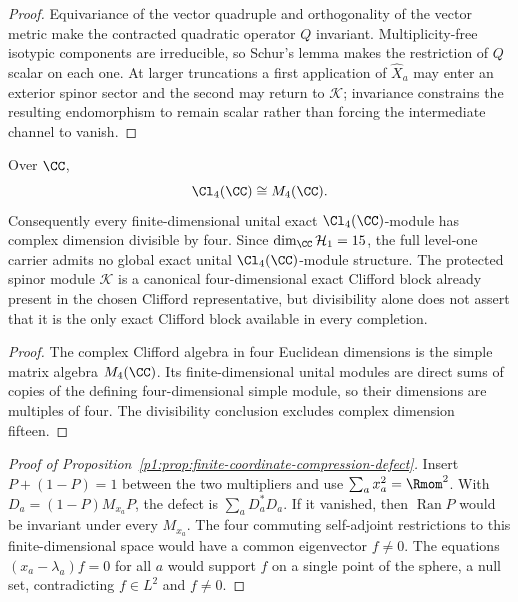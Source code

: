 \documentclass[11pt]{article}
\begin{document}
\begin{proof}
Equivariance of the vector quadruple and orthogonality of the vector metric
make the contracted quadratic operator \(Q\) invariant.  Multiplicity-free
isotypic components are irreducible, so Schur's lemma makes the restriction of
\(Q\) scalar on each one.  At larger truncations a first application of
\(\widehat X_a\) may enter an exterior spinor sector and the second may return
to \(\mathcal K\); invariance constrains the resulting endomorphism to remain
scalar rather than forcing the intermediate channel to vanish.
\end{proof}

\begin{proposition}
\label{p1:prop:global-clifford-divisibility-obstruction}
Over \(\CC\),
\[
 \Cl_4(\CC)\cong M_4(\CC).
\]
Consequently every finite-dimensional unital exact
\(\Cl_4(\CC)\)-module has complex dimension divisible by four.  Since
\(\dim_{\CC}\mathcal H_1=15\), the full level-one carrier admits no global
exact unital \(\Cl_4(\CC)\)-module structure.  The protected spinor module
\(\mathcal K\) is a canonical four-dimensional exact Clifford block already
present in the chosen Clifford representative, but divisibility alone does
not assert that it is the only exact Clifford block available in every
completion.
\end{proposition}

\begin{proof}
The complex Clifford algebra in four Euclidean dimensions is the simple
matrix algebra \(M_4(\CC)\).  Its finite-dimensional unital modules are direct
sums of copies of the defining four-dimensional simple module, so their
dimensions are multiples of four.  The divisibility conclusion excludes
complex dimension fifteen.
\end{proof}

\begin{proof}[Proof of Proposition~\ref{p1:prop:finite-coordinate-compression-defect}]
Insert \(P+(1-P)=1\) between the two multipliers and use
\(\sum_ax_a^2=\Rmom^2\).  With
\(D_a=(1-P)M_{x_a}P\), the defect is \(\sum_aD_a^*D_a\).  If it vanished,
then \(\operatorname{Ran}P\) would be invariant under every \(M_{x_a}\).
The four commuting self-adjoint restrictions to this finite-dimensional space
would have a common eigenvector \(f\ne0\).  The equations
\((x_a-\lambda_a)f=0\) for all \(a\) would support \(f\) on a single point of
the sphere, a null set, contradicting \(f\in L^2\) and \(f\ne0\).
\end{proof}
\end{document}
